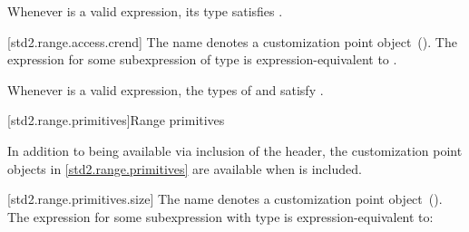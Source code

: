 \pnum
\enternote Whenever  is a valid expression, its
type satisfies . \exitnote

[std2.range.access.crend]{}
\pnum
The name  denotes a customization point
object~(). The expression
 for some subexpression  of type 
is expression-equivalent to .

\pnum
{}

\pnum
\enternote Whenever  is a valid expression, the
types of  and  satisfy
. \exitnote

[std2.range.primitives]{Range primitives}

\pnum
In addition to being available via inclusion of the 
header, the customization point objects in \ref{std2.range.primitives} are
available when  is included.

[std2.range.primitives.size]{}
\pnum
The name  denotes a customization point
object~(). The expression
 for some subexpression  with type
 is expression-equivalent to:


